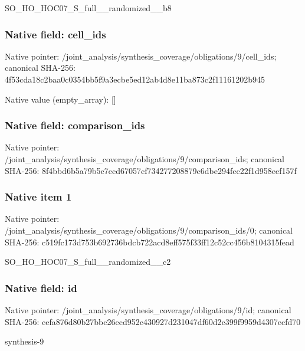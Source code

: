 \documentclass[10pt,a4paper]{article}
\begin{document}
\begingroup\raggedright\sloppy SO\_\allowbreak{}HO\_\allowbreak{}HOC07\_\allowbreak{}S\_\allowbreak{}full\_\allowbreak{}\_\allowbreak{}randomized\_\allowbreak{}\_\allowbreak{}b8\par\endgroup

\subsubsection{Native field: cell\_\allowbreak{}ids}
Native pointer: /joint\_\allowbreak{}analysis/synthesis\_\allowbreak{}coverage/obligations/9/cell\_\allowbreak{}ids; canonical SHA-256: 4f53cda18c2baa0c0354bb5f9a3ecbe5ed12ab4d8e11ba873c2f11161202b945

Native value (empty\_\allowbreak{}array): []

\subsubsection{Native field: comparison\_\allowbreak{}ids}
Native pointer: /joint\_\allowbreak{}analysis/synthesis\_\allowbreak{}coverage/obligations/9/comparison\_\allowbreak{}ids; canonical SHA-256: 8f4bbd6b5a79b5c7ecd67057cf734277208879c6dbe294fcc22f1d958eef157f

\subsubsection{Native item 1}
Native pointer: /joint\_\allowbreak{}analysis/synthesis\_\allowbreak{}coverage/obligations/9/comparison\_\allowbreak{}ids/0; canonical SHA-256: c519fc173d753b692736bdcb722acd8eff575f33ff12c52cc456b8104315fead

\begingroup\raggedright\sloppy SO\_\allowbreak{}HO\_\allowbreak{}HOC07\_\allowbreak{}S\_\allowbreak{}full\_\allowbreak{}\_\allowbreak{}randomized\_\allowbreak{}\_\allowbreak{}c2\par\endgroup

\subsubsection{Native field: id}
Native pointer: /joint\_\allowbreak{}analysis/synthesis\_\allowbreak{}coverage/obligations/9/id; canonical SHA-256: cefa876d80b27bbc26ecd952c430927d231047df60d2c399f9959d4307ecfd70

\begingroup\raggedright\sloppy synthesis-9\par\endgroup
\end{document}
